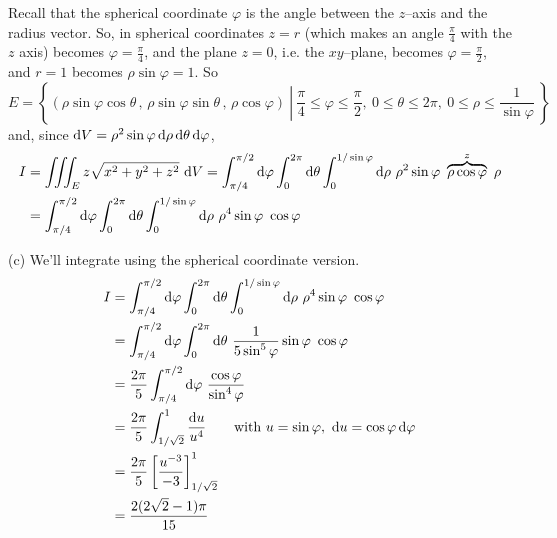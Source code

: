 \begin{solution}
Recall that the spherical coordinate $\varphi$ is the angle
between the $z$--axis and the radius vector. 
So, in spherical coordinates $z=r$ (which makes an angle $\frac{\pi}{4}$
with the $z$ axis) becomes $\varphi=\frac{\pi}{4}$, and
the plane $z=0$, i.e. the $xy$--plane, becomes $\varphi=\frac{\pi}{2}$,
and $r=1$ becomes $\rho\sin\varphi = 1$.  So
\begin{equation*}
E = \left\{(\rho\sin\varphi\cos\theta\,,\,\rho\sin\varphi\sin\theta\,,\,
          \rho\cos\varphi)\ \left|\ 
                    \frac{\pi}{4}\le \varphi\le \frac{\pi}{2},
            \ 0\le\theta\le 2\pi,
              \ 0\le \rho\le \frac{1}{\sin\varphi}\ \right.\right\}
\end{equation*}
and, since 
  $\mathrm{d}V = \rho^2\sin\varphi\,\mathrm{d}\rho\,\mathrm{d}\theta\,\mathrm{d}\varphi$,
\begin{align*}
I &= \tripInt_E z \sqrt{x^2 + y^2 + z^2}\  \dee{V}
  = \int_{\pi/4}^{\pi/2}\dee{\varphi} 
                \int_0^{2\pi}\dee{\theta} 
                \int_0^{1/\sin\varphi}\dee{\rho}\ 
                \rho^2\sin\varphi \ 
           \overbrace{\rho\cos\varphi}^{z}\ \rho \\
  &= \int_{\pi/4}^{\pi/2}\dee{\varphi} 
                \int_0^{2\pi}\dee{\theta} 
                \int_0^{1/\sin\varphi}\dee{\rho}\ 
                \rho^4\sin\varphi \ \cos\varphi
\end{align*} 

(c) We'll integrate using the spherical coordinate version.
\begin{align*}
I &= \int_{\pi/4}^{\pi/2}\dee{\varphi} 
                \int_0^{2\pi}\dee{\theta} 
                \int_0^{1/\sin\varphi}\dee{\rho}\ 
                \rho^4\sin\varphi \ \cos\varphi \\
  &= \int_{\pi/4}^{\pi/2}\dee{\varphi} 
                \int_0^{2\pi}\dee{\theta}\ 
                \frac{1}{5\sin^5\varphi}\sin\varphi \ \cos\varphi \\
  &= \frac{2\pi}{5}\int_{\pi/4}^{\pi/2}\dee{\varphi}\ 
                \frac{\cos\varphi}{\sin^4\varphi} \\
  &= \frac{2\pi}{5}\int_{1/\sqrt{2}}^{1} 
                \frac{\dee{u}}{u^4}\qquad\text{with }
                     u=\sin\varphi,\ \dee{u}=\cos\varphi\,\dee{\varphi} \\
  &= \frac{2\pi}{5} \left[\frac{u^{-3}}{-3}\right]_{1/\sqrt{2}}^{1}  \\
  &= \frac{2(2\sqrt{2}-1)\pi}{15}
\end{align*} 
\end{solution}

